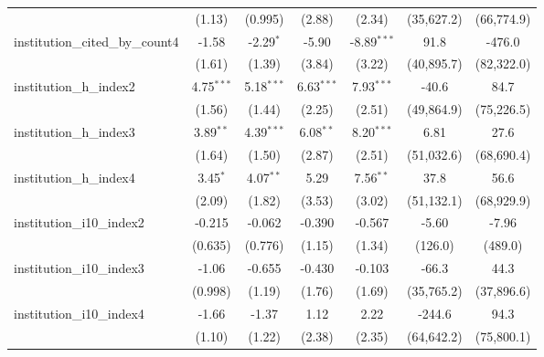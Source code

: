 \begin{tabular}{lcccccc}
                                         & (1.13)        & (0.995)       & (2.88)        & (2.34)        & (35,627.2)   & (66,774.9)\\   
   institution\_cited\_by\_count4        & -1.58         & -2.29$^{*}$   & -5.90         & -8.89$^{***}$ & 91.8         & -476.0\\   
                                         & (1.61)        & (1.39)        & (3.84)        & (3.22)        & (40,895.7)   & (82,322.0)\\   
   institution\_h\_index2                & 4.75$^{***}$  & 5.18$^{***}$  & 6.63$^{***}$  & 7.93$^{***}$  & -40.6        & 84.7\\   
                                         & (1.56)        & (1.44)        & (2.25)        & (2.51)        & (49,864.9)   & (75,226.5)\\   
   institution\_h\_index3                & 3.89$^{**}$   & 4.39$^{***}$  & 6.08$^{**}$   & 8.20$^{***}$  & 6.81         & 27.6\\   
                                         & (1.64)        & (1.50)        & (2.87)        & (2.51)        & (51,032.6)   & (68,690.4)\\   
   institution\_h\_index4                & 3.45$^{*}$    & 4.07$^{**}$   & 5.29          & 7.56$^{**}$   & 37.8         & 56.6\\   
                                         & (2.09)        & (1.82)        & (3.53)        & (3.02)        & (51,132.1)   & (68,929.9)\\   
   institution\_i10\_index2              & -0.215        & -0.062        & -0.390        & -0.567        & -5.60        & -7.96\\   
                                         & (0.635)       & (0.776)       & (1.15)        & (1.34)        & (126.0)      & (489.0)\\   
   institution\_i10\_index3              & -1.06         & -0.655        & -0.430        & -0.103        & -66.3        & 44.3\\   
                                         & (0.998)       & (1.19)        & (1.76)        & (1.69)        & (35,765.2)   & (37,896.6)\\   
   institution\_i10\_index4              & -1.66         & -1.37         & 1.12          & 2.22          & -244.6       & 94.3\\   
                                         & (1.10)        & (1.22)        & (2.38)        & (2.35)        & (64,642.2)   & (75,800.1)\\   

\end{tabular}
